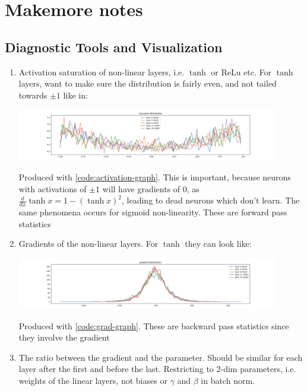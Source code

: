 \documentclass{article}
\begin{document}
\section*{Makemore notes}
\subsection*{Diagnostic Tools and Visualization}
    \begin{enumerate}
        \item Activation saturation of non-linear layers, i.e. $\tanh$ or ReLu etc.  For $\tanh$ layers, want to make sure the distribution is fairly even, and not tailed towards $\pm 1$ like in:

        \includegraphics[width=0.9\textwidth]{images/tanh-activation}        

        Produced with \ref{code:activation-graph}.  
        This is important, because neurons with activations of $\pm 1$ will have gradients of $0$, as $\frac{d}{dx}\tanh x = 1 - (\tanh x)^2$, leading to dead neurons which don't learn. 
        The same phenomena occurs for sigmoid non-linearity.
        These are forward pass statistics

        \item Gradients of the non-linear layers.  For $\tanh$ they can look like:

        \includegraphics[width=0.9\textwidth]{images/dsitribution of gradients.png}

        Produced with \ref{code:grad-graph}.  These are backward pass statistics since they involve the gradient

        \item The ratio between the gradient and the parameter.  
        Should be similar for each layer after the first and before the last.  
        Restricting to 2-dim parameters, i.e. weights of the linear layers, not biases or $\gamma$ and $\beta$ in batch norm.


\end{enumerate}
\end{document}
